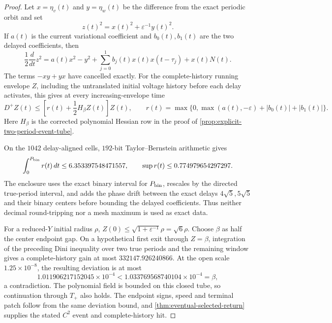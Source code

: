 \begin{proof}
Let \(x=\eta_v(t)\) and \(y=\eta_w(t)\) be the difference from the exact
periodic orbit and set
\[
 z(t)^2=x(t)^2+\varepsilon^{-1}y(t)^2.
\]
If \(a(t)\) is the current variational coefficient and \(b_0(t),b_1(t)\)
are the two delayed coefficients, then
\begin{equation}
 \frac12\frac{d}{dt}z^2
 =a(t)x^2-y^2+\sum_{j=0}^1b_j(t)x(t)x(t-\tau_j)+x(t)N(t).  \label{eq:weighted-energy-cancellation}
\end{equation}
The terms \(-xy+yx\) have cancelled exactly.  For the complete-history
running envelope \(Z\), including the untranslated initial voltage history
before each delay activates, this gives at every increasing-envelope time
\[
 D^+Z(t)\le\left[r(t)+\frac12H_\beta Z(t)\right]Z(t),
 \qquad
 r(t)=\max\{0,\max(a(t),-\varepsilon)+|b_0(t)|+|b_1(t)|\}.
\]
Here \(H_\beta\) is the corrected polynomial Hessian row in the proof of
\cref{prop:explicit-two-period-event-tube}.

On the \(1042\) delay-aligned cells, \(192\)-bit Taylor--Bernstein
arithmetic gives
\begin{equation}
 \int_0^{P_{\rm bin}}r(t)\,dt
 \le6.353397548471557,
 \qquad \sup r(t)\le0.774979654297297.                \label{eq:orbit-aware-rate}
\end{equation}
The enclosure uses the exact binary interval for \(P_{\rm bin}\), rescales
by the directed true-period interval, and adds the phase drift between the
exact delays \(4\sqrt5,5\sqrt5\) and their binary centers before bounding
the delayed coefficients.  Thus neither decimal round-tripping nor a mesh
maximum is used as exact data.

For a reduced-\(Y\) initial radius \(\rho\),
\(Z(0)\le\sqrt{1+\varepsilon^{-1}}\rho=\sqrt6\rho\).
Choose \(\beta\) as half the center endpoint gap.  On a hypothetical first
exit through \(Z=\beta\), integration of the preceding Dini inequality over
two true periods and the remaining window gives a complete-history gain at
most \(332147.926240866\).  At the open scale \(1.25\times10^{-8}\), the
resulting deviation is at most
\[
1.011906217152045\times10^{-4}<
1.033769568740104\times10^{-4}=\beta,
\]
a contradiction.  The polynomial
field is bounded on this closed tube, so continuation through \(T_+\) also
holds.  The endpoint signs, speed and terminal patch follow from the same
deviation bound, and \cref{thm:eventual-selected-return} supplies the stated
\(C^2\) event and complete-history hit.
\end{proof}

